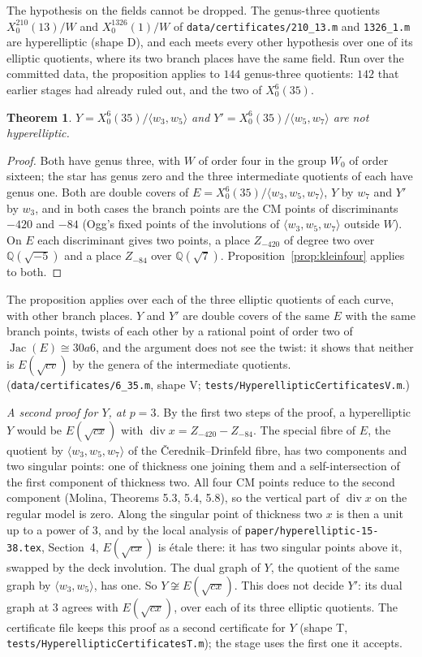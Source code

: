 \documentclass[11pt,reqno]{amsart}
\theoremstyle{plain}
\newtheorem{theorem}{Theorem}[section]
\theoremstyle{definition}
\DeclareMathOperator{\Jac}{Jac}
\newcommand{\Q}{\mathbb{Q}}
\begin{document}
The hypothesis on the fields cannot be dropped. The genus-three quotients $X_0^{210}(13)/W$ and
$X_0^{1326}(1)/W$ of \texttt{data/certificates/210\_13.m} and \texttt{1326\_1.m} are hyperelliptic (shape D), and
each meets every other hypothesis over one of its elliptic quotients, where its two branch places have the same
field. Run over the committed data, the proposition applies to $144$ genus-three quotients: $142$ that earlier
stages had already ruled out, and the two of $X_0^6(35)$.

\begin{theorem}
$Y=X_0^6(35)/\langle w_3,w_5\rangle$ and $Y'=X_0^6(35)/\langle w_5,w_7\rangle$ are not hyperelliptic.
\end{theorem}

\begin{proof}
Both have genus three, with $W$ of order four in the group $W_0$ of order sixteen; the star has genus zero and the
three intermediate quotients of each have genus one. Both are double covers of
$E=X_0^6(35)/\langle w_3,w_5,w_7\rangle$, $Y$ by $w_7$ and $Y'$ by $w_3$, and in both cases the branch points are the
CM points of discriminants $-420$ and $-84$ (Ogg's fixed points of the involutions of $\langle w_3,w_5,w_7\rangle$
outside $W$). On $E$ each discriminant gives two points, a place $Z_{-420}$ of degree two over $\Q(\sqrt{-5})$ and
a place $Z_{-84}$ over $\Q(\sqrt{7})$. Proposition~\ref{prop:kleinfour} applies to both.
\end{proof}

The proposition applies over each of the three elliptic quotients of each curve, with other branch places. $Y$ and
$Y'$ are double covers of the same $E$ with the same branch points, twists of each other by a rational point of
order two of $\Jac(E)\cong30a6$, and the argument does not see the twist: it shows that neither is $E(\sqrt{cv})$
by the genera of the intermediate quotients. (\texttt{data/certificates/6\_35.m}, shape V;
\texttt{tests/HyperellipticCertificatesV.m}.)

\emph{A second proof for $Y$, at $p=3$.} By the first two steps of the proof, a hyperelliptic $Y$ would be
$E(\sqrt{cx})$ with $\operatorname{div}x=Z_{-420}-Z_{-84}$. The special fibre of $E$, the quotient by
$\langle w_3,w_5,w_7\rangle$ of the \v{C}erednik--Drinfeld fibre, has two components and two singular points: one
of thickness one joining them and a self-intersection of the first component of thickness two. All four CM points
reduce to the second component (Molina, Theorems 5.3, 5.4, 5.8), so the vertical part of $\operatorname{div}x$ on
the regular model is zero. Along the singular point of thickness two $x$ is then a unit up to a power of $3$, and
by the local analysis of \texttt{paper/hyperelliptic-15-38.tex}, Section~4, $E(\sqrt{cx})$ is \'etale there: it
has two singular points above it, swapped by the deck involution. The dual graph of $Y$, the quotient of the same
graph by $\langle w_3,w_5\rangle$, has one. So $Y\not\cong E(\sqrt{cx})$. This does not decide $Y'$: its dual graph
at $3$ agrees with $E(\sqrt{cx})$, over each of its three elliptic quotients. The certificate file keeps this
proof as a second certificate for $Y$ (shape T, \texttt{tests/HyperellipticCertificatesT.m}); the stage uses the
first one it accepts.
\end{document}
